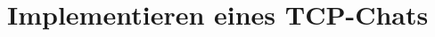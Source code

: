 \documentclass[twoside]{article}
\begin{document}
\subsection{}
\subsection{}
\subsection{}



\section{Implementieren eines TCP-Chats}
\subsection{}
\subsection{}
\subsection{}
\subsection{}
\subsection{}
\end{document}
